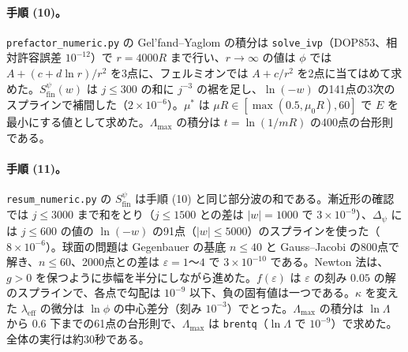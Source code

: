 \documentclass[a4paper,10pt]{ltjsarticle}
\begin{document}
\paragraph{手順 (10)。}\texttt{prefactor\_numeric.py} の Gel'fand--Yaglom の積分は \texttt{solve\_ivp}（DOP853、相対許容誤差 $10^{-12}$）で $r=4000R$ まで行い、$r\to\infty$ の値は $\phi$ では $A+(c+d\ln r)/r^2$ を3点に、フェルミオンでは $A+c/r^2$ を2点に当てはめて求めた。$S^\psi_{\mathrm{fin}}(w)$ は $j\le300$ の和に $j^{-3}$ の裾を足し、$\ln(-w)$ の141点の3次のスプラインで補間した（$2\times10^{-6}$）。$\mu^*$ は $\mu R\in[\max(0.5,\mu_0R),60]$ で $E$ を最小にする値として求めた。$\Lambda_{\max}$ の積分は $t=\ln(1/mR)$ の400点の台形則である。

\paragraph{手順 (11)。}\texttt{resum\_numeric.py} の $S^\psi_{\mathrm{fin}}$ は手順 (10) と同じ部分波の和である。漸近形の確認では $j\le3000$ まで和をとり（$j\le1500$ との差は $|w|=1000$ で $3\times10^{-9}$）、$\Delta_\psi$ には $j\le600$ の値の $\ln(-w)$ の91点（$|w|\le5000$）のスプラインを使った（$8\times10^{-6}$）。球面の問題は Gegenbauer の基底 $n\le40$ と Gauss--Jacobi の800点で解き、$n\le60$、2000点との差は $\varepsilon=1$〜$4$ で $3\times10^{-10}$ である。Newton 法は、$g>0$ を保つように歩幅を半分にしながら進めた。$f(\varepsilon)$ は $\varepsilon$ の刻み $0.05$ の解のスプラインで、各点で勾配は $10^{-9}$ 以下、負の固有値は一つである。$\kappa$ を変えた $\lambda_{\mathrm{eff}}$ の微分は $\ln\phi$ の中心差分（刻み $10^{-3}$）でとった。$\Lambda_{\max}$ の積分は $\ln\Lambda$ から $0.6$ 下までの61点の台形則で、$\Lambda_{\max}$ は \texttt{brentq}（$\ln\Lambda$ で $10^{-9}$）で求めた。全体の実行は約30秒である。
\end{document}
